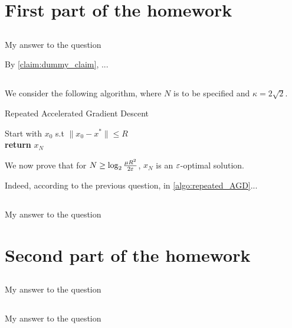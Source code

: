 \documentclass{article}
\numberwithin{equation}{subsection}
\begin{document}
\section*{First part of the homework}

\subsection{}
My answer to the question

By \autoref{claim:dummy_claim}, ...

\subsection{}
We consider the following algorithm, where $N$ is to be specified and $\kappa = 2 \sqrt{2}$.

\begin{algorithm}[H]
	\SetAlgoLined
	\caption{Repeated Accelerated Gradient Descent} \label{algo:repeated_AGD}
	Start with $x_0$ s.t $\|x_0 - x^*\| \leq R$ \\
	\textbf{return} $x_N$
\end{algorithm}

We now prove that for $N \geq \log_2 \frac{\mu R^2}{2 \varepsilon}$, $x_N$ is an $\varepsilon$-optimal solution.

Indeed, according to the previous question, in \autoref{algo:repeated_AGD}...

\subsection{}
My answer to the question



\section*{Second part of the homework}

\subsection{}
My answer to the question

\subsection{}
My answer to the question
\end{document}
